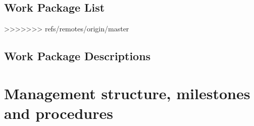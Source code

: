 

\subsection{Work Package List}\label{sec:wplist}
>>>>>>> refs/remotes/origin/master

\wpfigstyle{\footnotesize}

\newpage

\subsection{Work Package Descriptions}\label{sec:workpackages}
\begin{workplan}
  \newpage
  \newpage
  \newpage
  \newpage
  \newpage
  \newpage
  \newpage
  \newpage
  \newpage
  \newpage
\end{workplan}

\ganttchart[draft,xscale=.45] 

\section{Management structure, milestones and procedures}

